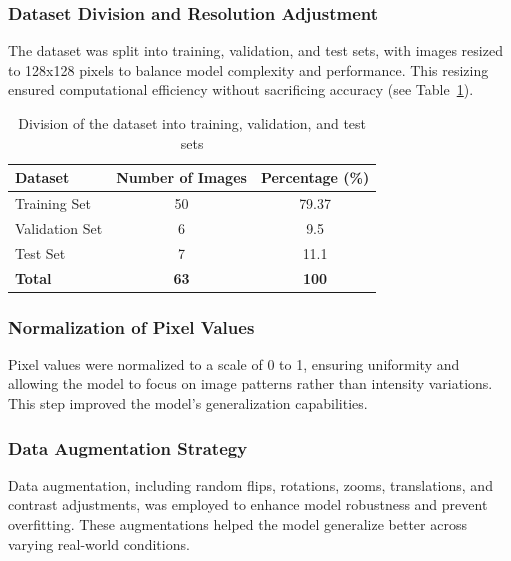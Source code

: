 \documentclass{ieeeaccess}
\begin{document}
\subsubsection{Dataset Division and Resolution Adjustment}
The dataset was split into training, validation, and test sets, with images resized to 128x128 pixels to balance model complexity and performance. This resizing ensured computational efficiency without sacrificing accuracy (see Table~\ref{tab:dataset_division}).

\begin{table}[htbp]
\centering
\small
\caption{Division of the dataset into training, validation, and test sets}
\label{tab:dataset_division}
\begin{tabular}{@{}lcc@{}}
\toprule
\textbf{Dataset} & \textbf{Number of Images} & \textbf{Percentage (\%)} \\ \midrule
Training Set & 50 & 79.37 \\
Validation Set & 6 & 9.5 \\ \bottomrule
Test Set & 7 & 11.1 \\ \bottomrule
\textbf{Total} & \textbf{63} & \textbf{100} \\ \bottomrule
\end{tabular}
\end{table}

\subsubsection{Normalization of Pixel Values}
Pixel values were normalized to a scale of 0 to 1, ensuring uniformity and allowing the model to focus on image patterns rather than intensity variations. This step improved the model's generalization capabilities.

\subsubsection{Data Augmentation Strategy}
Data augmentation, including random flips, rotations, zooms, translations, and contrast adjustments, was employed to enhance model robustness and prevent overfitting. These augmentations helped the model generalize better across varying real-world conditions.
\end{document}
